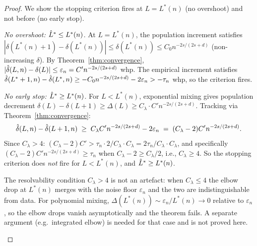 \begin{proof}
We show the stopping criterion fires at $L = L^*(n)$ (no overshoot)
and not before (no early stop).

\emph{No overshoot: $\hat{L}^* \leq L^*(n)$.}
At $L = L^*(n)$, the population increment satisfies
$|\delta(L^*(n)+1) - \delta(L^*(n))| \leq \delta(L^*(n)) \leq C_0 n^{-2s/(2s+d)}$ (non-increasing $\delta$).
By Theorem~\ref{thm:convergence}, $|\hat{\delta}(L,n) - \delta(L)| \leq \varepsilon_n = C' n^{-2s/(2s+d)}$ whp.
The empirical increment satisfies
$\hat{\delta}(L^*+1,n) - \hat{\delta}(L^*,n) \geq -C_0 n^{-2s/(2s+d)} - 2\varepsilon_n > -\tau_n$ whp,
so the criterion fires.

\emph{No early stop: $\hat{L}^* \geq L^*(n)$.}
For $L < L^*(n)$, exponential mixing gives population decrement
$\delta(L) - \delta(L+1) \geq \Delta(L) \geq C_\lambda \cdot C' n^{-2s/(2s+d)}$.
Tracking via Theorem~\ref{thm:convergence}:
\[
  \hat{\delta}(L,n) - \hat{\delta}(L+1,n)
  \;\geq\; C_\lambda C' n^{-2s/(2s+d)} - 2\varepsilon_n
  \;=\; (C_\lambda - 2)C' n^{-2s/(2s+d)}.
\]
Since $C_\lambda > 4$: $(C_\lambda - 2)C' > \tau_n \cdot 2/C_\lambda \cdot C_\lambda = 2\tau_n/C_\lambda \cdot C_\lambda$,
and specifically $(C_\lambda - 2)C' n^{-2s/(2s+d)} \geq \tau_n$ when
$C_\lambda - 2 \geq C_\lambda/2$, i.e., $C_\lambda \geq 4$.
So the stopping criterion does \emph{not} fire for $L < L^*(n)$, and $\hat{L}^* \geq L^*(n)$.

\begin{remark}
The resolvability condition $C_\lambda > 4$ is not an artefact: when
$C_\lambda \leq 4$ the elbow drop at $L^*(n)$ merges with the noise floor
$\varepsilon_n$ and the two are indistinguishable from data.
For polynomial mixing, $\Delta(L^*(n)) \sim \varepsilon_n / L^*(n) \to 0$
relative to $\varepsilon_n$, so the elbow drops vanish asymptotically and
the theorem fails.
A separate argument (e.g.\ integrated elbow) is needed for that case and is
not proved here.
\end{remark}
\end{proof}

